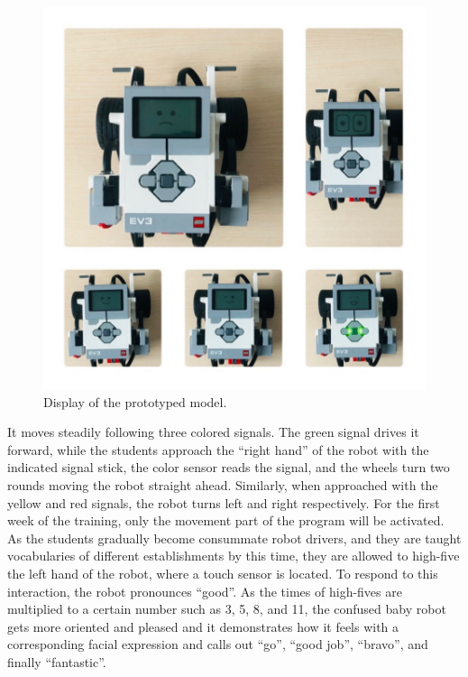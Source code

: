 \documentclass[english]{textolivre}
\begin{document}
\begin{figure}[htbp]
\centering
\begin{minipage}{.85\textwidth}
 \includegraphics[width=\textwidth]{Fig5.png}
 \caption{Display of the prototyped model.}
 \label{fig05}
\end{minipage}
\end{figure}

It moves steadily following three colored signals. The green signal drives it forward, while the students approach the “right hand” of the robot with the indicated signal stick, the color sensor reads the signal, and the wheels turn two rounds moving the robot straight ahead. Similarly, when approached with the yellow and red signals, the robot turns left and right respectively. For the first week of the training, only the movement part of the program will be activated. As the students gradually become consummate robot drivers, and they are taught vocabularies of different establishments by this time, they are allowed to high-five the left hand of the robot, where a touch sensor is located. To respond to this interaction, the robot pronounces “good”.  As the times of high-fives are multiplied to a certain number such as 3, 5, 8, and 11, the confused baby robot gets more oriented and pleased and it demonstrates how it feels with a corresponding facial expression and calls out “go”, “good job”, “bravo”, and finally “fantastic”.
\end{document}
